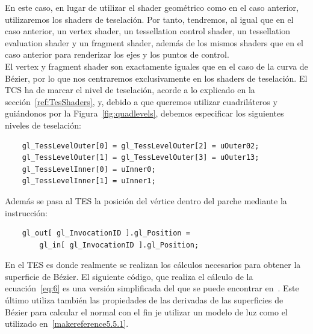 En este caso, en lugar de utilizar el shader geométrico como en el caso
anterior, utilizaremos los shaders de teselación. Por tanto, tendremos, al igual
que en el caso anterior, un vertex shader, un tessellation control shader, un
tessellation evaluation shader y un fragment shader, además de los mismos
shaders que en el caso anterior para renderizar los ejes y los puntos de
control. \\

El vertex y fragment shader son exactamente iguales que en el caso de la curva
de Bézier, por lo que nos centraremos exclusivamente en los shaders de
teselación. El TCS ha de marcar el nivel de teselación, acorde a lo explicado en
la sección~\ref{ref:TesShaders}, y, debido a que queremos utilizar cuadriláteros
y guiándonos por la Figura~\ref{fig:quadlevels}, debemos especificar los
siguientes niveles de teselación:

\begin{verbatim}
    gl_TessLevelOuter[0] = gl_TessLevelOuter[2] = uOuter02;
    gl_TessLevelOuter[1] = gl_TessLevelOuter[3] = uOuter13;
    gl_TessLevelInner[0] = uInner0;
    gl_TessLevelInner[1] = uInner1;
\end{verbatim}

Además se pasa al TES la posición del vértice dentro del parche mediante la
instrucción:

\begin{verbatim}
    gl_out[ gl_InvocationID ].gl_Position =
        gl_in[ gl_InvocationID ].gl_Position;
\end{verbatim}

En el TES es donde realmente se realizan los cálculos necesarios para obtener la
superficie de Bézier. El siguiente código, que realiza el cálculo de la
ecuación~\eqref{eq:6} es una versión simplificada del que se puede encontrar
en~\citet{Bailey}. Este último utiliza también las propiedades de las derivadas
de las superficies de Bézier para calcular el normal con el fin je utilizar un
modelo de luz como el utilizado en~\ref{makereference5.5.1}.

